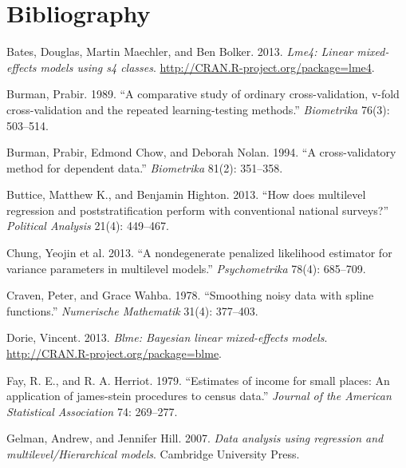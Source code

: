 \documentclass[11pt,article,oneside]{memoir}
\begin{document}
\section*{Bibliography}\label{bibliography}

Bates, Douglas, Martin Maechler, and Ben Bolker. 2013. \emph{Lme4:
Linear mixed-effects models using s4 classes}.
\url{http://CRAN.R-project.org/package=lme4}.

Burman, Prabir. 1989. ``A comparative study of ordinary
cross-validation, v-fold cross-validation and the repeated
learning-testing methods.'' \emph{Biometrika} 76(3): 503--514.

Burman, Prabir, Edmond Chow, and Deborah Nolan. 1994. ``A
cross-validatory method for dependent data.'' \emph{Biometrika} 81(2):
351--358.

Buttice, Matthew K., and Benjamin Highton. 2013. ``How does multilevel
regression and poststratification perform with conventional national
surveys?'' \emph{Political Analysis} 21(4): 449--467.

Chung, Yeojin et al. 2013. ``A nondegenerate penalized likelihood
estimator for variance parameters in multilevel models.''
\emph{Psychometrika} 78(4): 685--709.

Craven, Peter, and Grace Wahba. 1978. ``Smoothing noisy data with spline
functions.'' \emph{Numerische Mathematik} 31(4): 377--403.

Dorie, Vincent. 2013. \emph{Blme: Bayesian linear mixed-effects models}.
\url{http://CRAN.R-project.org/package=blme}.

Fay, R. E., and R. A. Herriot. 1979. ``Estimates of income for small
places: An application of james-stein procedures to census data.''
\emph{Journal of the American Statistical Association} 74: 269--277.

Gelman, Andrew, and Jennifer Hill. 2007. \emph{Data analysis using
regression and multilevel/Hierarchical models}. Cambridge University
Press.
\end{document}
